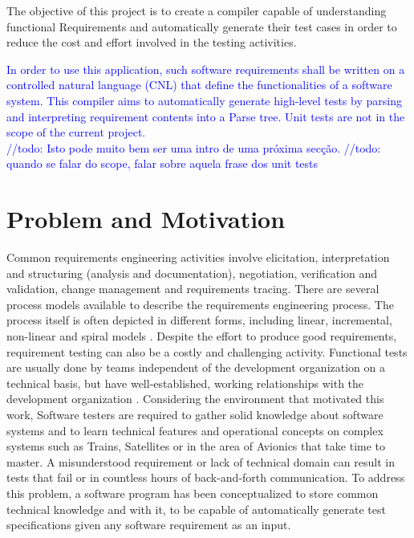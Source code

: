 The objective of this project is to create a compiler capable of understanding functional Requirements and automatically generate their test cases in order to reduce the cost and effort involved in the testing activities. 

\textcolor{blue}{
In order to use this application, such software requirements shall be written on a controlled natural language (CNL) that define the functionalities of a software system. This compiler aims to automatically generate high-level tests by parsing and interpreting requirement contents into a Parse tree. Unit tests are not in the scope of the current project. \\
//todo: Isto pode muito bem ser uma intro de uma próxima secção.
//todo: quando se falar do scope, falar sobre aquela frase dos unit tests
}

\section{Problem and Motivation}
\label{sec:problem_and_motivation}

Common requirements engineering activities involve elicitation, interpretation and
structuring (analysis and documentation), negotiation, verification and validation,
change management and requirements tracing. There are several process models
available to describe the requirements engineering process. The process itself is
often depicted in different forms, including linear, incremental, non-linear and spiral models \cite{aurum_engineering_2005}.
Despite the effort to produce good requirements, requirement testing can also be a costly and challenging activity. 
Functional tests are usually done by teams independent of the development organization on a technical basis, but have well-established, working relationships with the development organization \cite{noauthor_independent_2013}. Considering the environment that motivated this work, Software testers are required to gather solid knowledge about software systems and to learn technical features and operational concepts on complex systems such as Trains, Satellites or in the area of Avionics that take time to master. A misunderstood requirement or lack of technical domain can result in tests that fail or in countless hours of back-and-forth communication.
To address this problem, a software program has been conceptualized to store common technical knowledge and with it, to be capable of automatically generate test specifications given any software requirement as an input.


